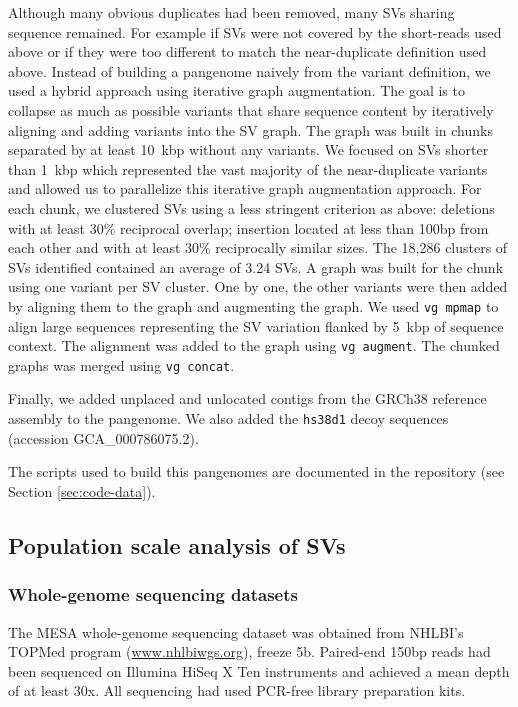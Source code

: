 \documentclass[11pt]{ucscthesis}
\begin{document}
Although many obvious duplicates had been removed, many SVs sharing sequence remained.
For example if SVs were not covered by the short-reads used above or if they were too different to match the near-duplicate definition used above.
Instead of building a pangenome naively from the variant definition, we used a hybrid approach using iterative graph augmentation.
The goal is to collapse as much as possible variants that share sequence content by iteratively aligning and adding variants into the SV graph.
The graph was built in chunks separated by at least 10~kbp without any variants.
We focused on SVs shorter than 1~kbp which represented the vast majority of the near-duplicate variants and allowed us to parallelize this iterative graph augmentation approach.
For each chunk, we clustered SVs using a less stringent criterion as above: deletions with at least 30\% reciprocal overlap; insertion located at less than 100bp from each other and with at least 30\% reciprocally similar sizes.
The 18,286 clusters of SVs identified contained an average of 3.24 SVs.
A graph was built for the chunk using one variant per SV cluster.
One by one, the other variants were then added by aligning them to the graph and augmenting the graph.
We used \texttt{vg~mpmap} \cite{sibbesen2021haplotype} to align large sequences representing the SV variation flanked by 5~kbp of sequence context.
The alignment was added to the graph using \texttt{vg~augment}.
The chunked graphs was merged using \texttt{vg~concat}.

Finally, we added unplaced and unlocated contigs from the GRCh38 reference assembly to the pangenome.
We also added the \texttt{hs38d1} decoy sequences (accession GCA\_000786075.2).

The scripts used to build this pangenomes are documented in the repository (see Section \ref{sec:code-data}).

\subsection{Population scale analysis of SVs}

\subsubsection{Whole-genome sequencing datasets}

The MESA whole-genome sequencing dataset was obtained from NHLBI’s TOPMed program (\url{www.nhlbiwgs.org}), freeze 5b.
Paired-end 150bp reads had been sequenced on Illumina HiSeq X Ten instruments and achieved a mean depth of at least 30x.
All sequencing had used PCR-free library preparation kits.
\end{document}
